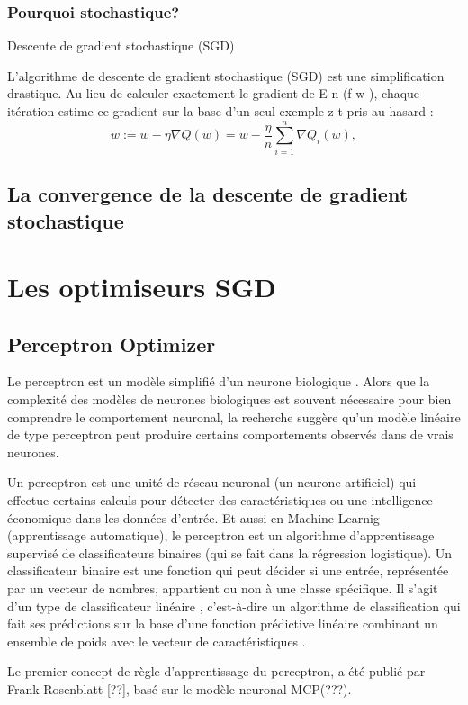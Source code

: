 	
	\lipsum[4]
	\subsubsection{Pourquoi stochastique?}
	Descente de gradient stochastique (SGD) 
	
	L'algorithme de descente de gradient stochastique (SGD) est une simplification drastique. Au lieu de calculer exactement le gradient de E n (f w ), chaque itération estime ce gradient sur la base d'un seul exemple z t pris au hasard \cite{bottou2012stochastic} :
	$$
	{\displaystyle w:=w-\eta \nabla Q(w)=w-{\frac {\eta }{n}}\sum _{i=1}^{n}\nabla Q_{i}(w),}
	$$
	\lipsum[1]	
	\subsection{La convergence de la descente de gradient stochastique}
	\lipsum[1]	
	
	\section{Les optimiseurs SGD}
	\subsection{Perceptron Optimizer}
	
	Le perceptron est un modèle simplifié d'un neurone biologique . Alors que la complexité des modèles de neurones biologiques est souvent nécessaire pour bien comprendre le comportement neuronal, la recherche suggère qu'un modèle linéaire de type perceptron peut produire certains comportements observés dans de vrais neurones.
	
	Un perceptron est une unité de réseau neuronal (un neurone artificiel) qui effectue certains calculs pour détecter des caractéristiques ou une intelligence économique dans les données d'entrée.
	Et aussi en Machine Learnig (apprentissage automatique), le perceptron est un algorithme d'apprentissage supervisé de classificateurs binaires (qui se fait dans la régression logistique). 
	Un classificateur binaire est une fonction qui peut décider si une entrée, représentée par un vecteur de nombres, appartient ou non à une classe spécifique. \cite{freund1999large} Il s'agit d'un type de classificateur linéaire , c'est-à-dire un algorithme de classification qui fait ses prédictions sur la base d'une fonction prédictive linéaire combinant un ensemble de poids avec le vecteur de caractéristiques .
	
	Le premier concept de règle d'apprentissage du perceptron, a été publié par Frank Rosenblatt [??],  basé sur le modèle neuronal MCP(???). 
	
